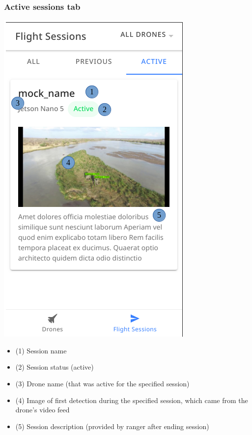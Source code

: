 \subsubsection{Active sessions tab}
\begin{minipage}[c]{0.5\linewidth}
	\centering
	\includegraphics[scale=0.4]{./assets/images/active-sessions.png}
	\label{fig: sessionsPageActive}
\end{minipage}
\begin{minipage}[c]{0.5\linewidth}
	\begin{itemize}
		\item (1) Session name
		\item (2) Session status (active)
		\item (3) Drone name (that was active for the specified session)
		\item (4) Image of first detection during the specified session, which came from the drone's video feed
		\item (5) Session description (provided by ranger after ending session)
	\end{itemize}
\end{minipage}

